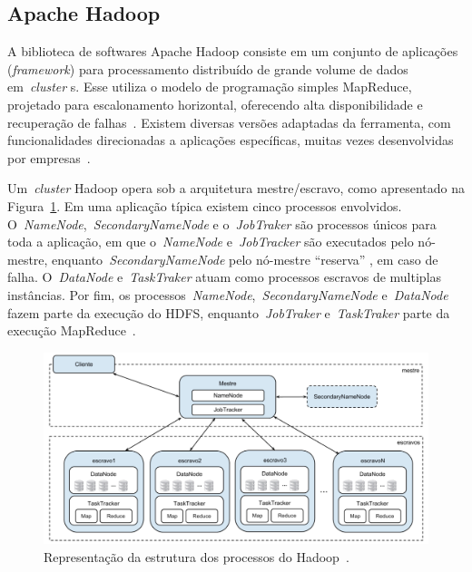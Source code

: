\documentclass[12pt]{article}
\begin{document}
\subsection{Apache Hadoop}
\label{section:ferramentas}

A biblioteca de softwares Apache Hadoop consiste em um conjunto de aplicações (\textit{framework}) para processamento distribuído de grande volume de dados em~\emph{cluster} s. Esse utiliza o modelo de programação simples MapReduce, projetado para escalonamento horizontal, oferecendo alta disponibilidade e recuperação de falhas~\cite{hadoophbase}.
Existem diversas versões adaptadas da ferramenta, com funcionalidades direcionadas a aplicações específicas, muitas vezes desenvolvidas por empresas~\cite{goldman2012apache}.


Um~\emph{cluster}  Hadoop opera sob a arquitetura mestre/escravo, como apresentado na Figura~\ref{figure:hadoop}. 
Em uma aplicação típica existem cinco processos envolvidos. 
O~\emph{NameNode},~\emph{SecondaryNameNode} e o~\emph{JobTraker} são processos únicos para toda a aplicação, em que o~\emph{NameNode} e~\emph{JobTracker} são executados pelo nó-mestre, enquanto~\emph{SecondaryNameNode} pelo nó-mestre ``reserva'' , em caso de falha. 
O~\emph{DataNode} e~\emph{TaskTraker} atuam como processos escravos de multiplas instâncias. 
Por fim, os processos~\emph{NameNode},~\emph{SecondaryNameNode} e~\emph{DataNode} fazem parte da execução do HDFS, enquanto~\emph{JobTraker} e~\emph{TaskTraker} parte da execução MapReduce~\cite{goldman2012apache}.

\begin{figure}[!ht]
\includegraphics[width=\textwidth]{images/hadoop.png}
\caption{Representação da estrutura dos processos do Hadoop~\cite{goldman2012apache}.}
\label{figure:hadoop}
\end{figure}
\end{document}
